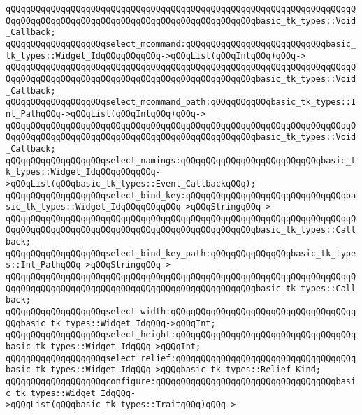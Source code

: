 \verb|qQQqqQQqqQQqqQQqqQQqqQQqqQQqqQQqqQQqqQQqqQQqqQQqqQQqqQQqqQQqqQQqqQQqqQQqqQQqqQQqqQQqqQQqqQQqqQQqqQQqqQQqqQQqqQQqqQQqqQQqbasic_tk_types::Void_Callback;|\newline
\verb|qQQqqQQqqQQqqQQqqQQqselect_mcommand:qQQqqQQqqQQqqQQqqQQqqQQqqQQqbasic_tk_types::Widget_IdqQQqqQQqqQQq->qQQqList(qQQqIntqQQq)qQQq->|\newline
\verb|qQQqqQQqqQQqqQQqqQQqqQQqqQQqqQQqqQQqqQQqqQQqqQQqqQQqqQQqqQQqqQQqqQQqqQQqqQQqqQQqqQQqqQQqqQQqqQQqqQQqqQQqqQQqqQQqqQQqqQQqbasic_tk_types::Void_Callback;|\newline
\verb|qQQqqQQqqQQqqQQqqQQqselect_mcommand_path:qQQqqQQqqQQqbasic_tk_types::Int_PathqQQq->qQQqList(qQQqIntqQQq)qQQq->|\newline
\verb|qQQqqQQqqQQqqQQqqQQqqQQqqQQqqQQqqQQqqQQqqQQqqQQqqQQqqQQqqQQqqQQqqQQqqQQqqQQqqQQqqQQqqQQqqQQqqQQqqQQqqQQqqQQqqQQqqQQqqQQqbasic_tk_types::Void_Callback;|\newline
\verb|qQQqqQQqqQQqqQQqqQQqselect_namings:qQQqqQQqqQQqqQQqqQQqqQQqqQQqbasic_tk_types::Widget_IdqQQqqQQqqQQq->qQQqList(qQQqbasic_tk_types::Event_CallbackqQQq);|\newline
\verb|qQQqqQQqqQQqqQQqqQQqselect_bind_key:qQQqqQQqqQQqqQQqqQQqqQQqqQQqqQQqbasic_tk_types::Widget_IdqQQqqQQqqQQq->qQQqStringqQQq->|\newline
\verb|qQQqqQQqqQQqqQQqqQQqqQQqqQQqqQQqqQQqqQQqqQQqqQQqqQQqqQQqqQQqqQQqqQQqqQQqqQQqqQQqqQQqqQQqqQQqqQQqqQQqqQQqqQQqqQQqqQQqqQQqbasic_tk_types::Callback;|\newline
\verb|qQQqqQQqqQQqqQQqqQQqselect_bind_key_path:qQQqqQQqqQQqqQQqbasic_tk_types::Int_PathqQQq->qQQqStringqQQq->|\newline
\verb|qQQqqQQqqQQqqQQqqQQqqQQqqQQqqQQqqQQqqQQqqQQqqQQqqQQqqQQqqQQqqQQqqQQqqQQqqQQqqQQqqQQqqQQqqQQqqQQqqQQqqQQqqQQqqQQqqQQqqQQqbasic_tk_types::Callback;|\newline
\verb|qQQqqQQqqQQqqQQqqQQqselect_width:qQQqqQQqqQQqqQQqqQQqqQQqqQQqqQQqqQQqqQQqbasic_tk_types::Widget_IdqQQq->qQQqInt;|\newline
\verb|qQQqqQQqqQQqqQQqqQQqselect_height:qQQqqQQqqQQqqQQqqQQqqQQqqQQqqQQqqQQqbasic_tk_types::Widget_IdqQQq->qQQqInt;|\newline
\verb|qQQqqQQqqQQqqQQqqQQqselect_relief:qQQqqQQqqQQqqQQqqQQqqQQqqQQqqQQqqQQqbasic_tk_types::Widget_IdqQQq->qQQqbasic_tk_types::Relief_Kind;|\newline
\newline
\newline
\verb|qQQqqQQqqQQqqQQqqQQqconfigure:qQQqqQQqqQQqqQQqqQQqqQQqqQQqqQQqqQQqbasic_tk_types::Widget_IdqQQq->qQQqList(qQQqbasic_tk_types::TraitqQQq)qQQq->|\newline
